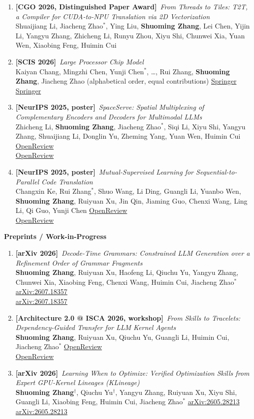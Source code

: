 \documentclass[11pt]{article}
\newcommand{\pub}[4]{%
  \item \textbf{[#1]}\, \emph{#2}\\[0.25ex]
  {\small #3}%
  \ifx\relax#4\relax\else\\[0.25ex]{\small #4}\fi}
\newcommand{\me}{\textbf{Shuoming Zhang}}
\newcommand{\eq}{$^{\dagger}$}
\newcommand{\co}{$^{*}$}
\begin{document}
\begin{enumerate}[leftmargin=1.6em,itemsep=0.6ex,topsep=0.4ex,label=\arabic*.]
  \pub{CGO 2026, Distinguished Paper Award}{From Threads to Tiles: T2T, a Compiler for CUDA-to-NPU Translation via 2D Vectorization}{Shuaijiang Li, Jiacheng Zhao\co, Ying Liu, \me, Lei Chen, Yijin Li, Yangyu Zhang, Zhicheng Li, Runyu Zhou, Xiyu Shi, Chunwei Xia, Yuan Wen, Xiaobing Feng, Huimin Cui}{\relax}

  \pub{SCIS 2026}{Large Processor Chip Model}{Kaiyan Chang, Mingzhi Chen, Yunji Chen\co, \ldots, Rui Zhang, \me, Jiacheng Zhao (alphabetical order, equal contributions)}{\href{https://link.springer.com/article/10.1007/s11432-025-4739-1}{Springer}}

  \pub{NeurIPS 2025, poster}{SpaceServe: Spatial Multiplexing of Complementary Encoders and Decoders for Multimodal LLMs}{Zhicheng Li, \me, Jiacheng Zhao\co, Siqi Li, Xiyu Shi, Yangyu Zhang, Shuaijiang Li, Donglin Yu, Zheming Yang, Yuan Wen, Huimin Cui}{\href{https://openreview.net/forum?id=w4qJ056WhI}{OpenReview}}

  \pub{NeurIPS 2025, poster}{Mutual-Supervised Learning for Sequential-to-Parallel Code Translation}{Changxin Ke, Rui Zhang\co, Shuo Wang, Li Ding, Guangli Li, Yuanbo Wen, \me, Ruiyuan Xu, Jin Qin, Jiaming Guo, Chenxi Wang, Ling Li, Qi Guo, Yunji Chen}{\href{https://openreview.net/forum?id=bjUDrU4wPv}{OpenReview}}
\end{enumerate}

\textbf{\color{accent}Preprints / Work-in-Progress}
\begin{enumerate}[leftmargin=1.6em,itemsep=0.6ex,topsep=0.4ex,label=\arabic*.,start=1]
  \pub{arXiv 2026}{Decode-Time Grammars: Constrained LLM Generation over a Refinement Order of Grammar Fragments}{\me, Ruiyuan Xu, Haofeng Li, Qiuchu Yu, Yangyu Zhang, Chunwei Xia, Xiaobing Feng, Chenxi Wang, Huimin Cui, Jiacheng Zhao\co}{\href{https://arxiv.org/abs/2607.18357}{arXiv:2607.18357}}

  \pub{Architecture 2.0 @ ISCA 2026, workshop}{From Skills to Tracelets: Dependency-Guided Transfer for LLM Kernel Agents}{\me, Ruiyuan Xu, Qiuchu Yu, Guangli Li, Huimin Cui, Jiacheng Zhao\co}{\href{https://openreview.net/forum?id=4Ago0kstgs}{OpenReview}}

  \pub{arXiv 2026}{Learning When to Optimize: Verified Optimization Skills from Expert GPU-Kernel Lineages (KLineage)}{\me\eq, Qiuchu Yu\eq, Yangyu Zhang, Ruiyuan Xu, Xiyu Shi, Guangli Li, Xiaobing Feng, Huimin Cui, Jiacheng Zhao\co}{\href{https://arxiv.org/abs/2605.28213}{arXiv:2605.28213}}
\end{enumerate}
\end{document}
